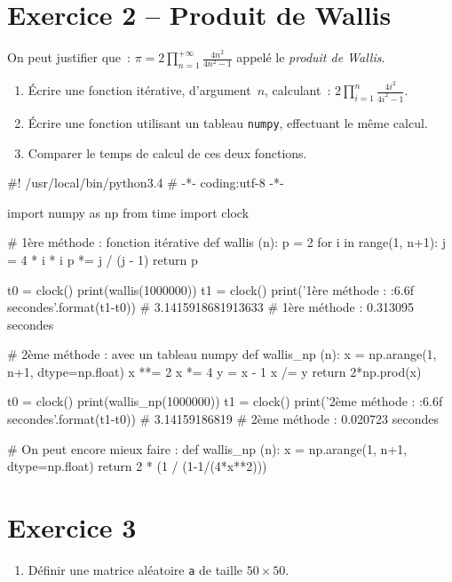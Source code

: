 \documentclass[10pt,fleqn]{article} %
\begin{document}
\begin{multicols}{2}
\begin{corrige}
\end{corrige}
\else
\fi

\section*{Exercice 2 -- Produit de Wallis}
On peut justifier que~: $
\pi = 2  \prod_{n=1}^{+\infty} \frac{4n^2}{4n^2-1}
$
appelé le \emph{produit de Wallis}.
\begin{enumerate}
\item Écrire une fonction itérative, d'argument~$n$, calculant~: $
  2 \displaystyle\prod\limits_{i=1}^{n} \frac{4i^2}{4i^2-1}
  $.
\item   Écrire une fonction utilisant un tableau \texttt{numpy}, effectuant
  le même calcul.
\item   Comparer le temps de calcul de ces deux fonctions.
\end{enumerate}
\ifprof 
\begin{corrige}
\begin{python}
#! /usr/local/bin/python3.4
# -*- coding:utf-8 -*-
    
import numpy as np
from time import clock

# 1ère méthode : fonction itérative
def wallis (n):
    p = 2
    for i in range(1, n+1):
        j = 4 * i * i
        p *= j / (j - 1)
    return p

t0 = clock()
print(wallis(1000000))
t1 = clock()
print('1ère méthode : {:6.6f} secondes'.format(t1-t0))
# 3.1415918681913633
# 1ère méthode : 0.313095 secondes

# 2ème méthode : avec un tableau numpy
def wallis_np (n):
    x = np.arange(1, n+1, dtype=np.float)
    x **= 2
    x *= 4
    y = x - 1
    x /= y
    return 2*np.prod(x)

t0 = clock()
print(wallis_np(1000000))
t1 = clock()
print('2ème méthode : {:6.6f} secondes'.format(t1-t0))
# 3.14159186819
# 2ème méthode : 0.020723 secondes

# On peut encore mieux faire :
def wallis_np (n):
    x = np.arange(1, n+1, dtype=np.float)
    return 2 * (1 / (1-1/(4*x**2)))
\end{python}
\end{corrige}
\else
\fi


\section*{Exercice 3}
\begin{enumerate}
\item Définir une matrice aléatoire \texttt{a} de taille $50\times 50$.


\end{enumerate}
\end{multicols}
\end{document}
